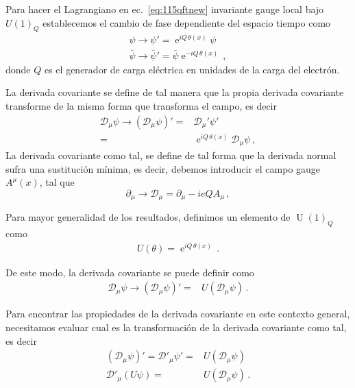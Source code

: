 \begin{frame}
Para hacer el Lagrangiano en ec.~\eqref{eq:115qftnew} invariante gauge local bajo $U(1)_Q$ establecemos el cambio de fase dependiente del espacio tiempo como
\begin{align}
  \psi\to\psi'=\operatorname{e}^{iQ\, \theta(x)}\psi\nonumber\\
  \bar{\psi}\to\bar{\psi}'=\bar{\psi}\operatorname{e}^{-iQ\,\theta(x)}\,,
\end{align}
donde $Q$ es el generador de carga eléctrica en unidades de la carga del electrón.

La derivada covariante se define de tal manera que la propia derivada covariante transforme de la misma forma que transforma el campo, es decir
\begin{align}
  \mathcal{D}_{\mu}\psi\to \left( \mathcal{D}_{\mu}\psi \right)'=&\mathcal{D}_{\mu}'\psi' \nonumber\\
=&\operatorname{e}^{iQ\, \theta(x)}\mathcal{D}_{\mu}\psi\,,
\end{align}
La derivada covariante como tal, se define de tal forma  que la derivada normal sufra una sustitución mínima, es decir, debemos introducir el campo gauge $A^\mu(x)$, tal que
\begin{equation}
  \label{eq:202qft}
  \partial_\mu\to\mathcal{D}_\mu=\partial_\mu-ieQA_\mu\,,
\end{equation}


Para mayor generalidad de los resultados, definimos un elemento de $\operatorname{U}(1)_Q$ como
\begin{align}
  U(\theta)=\operatorname{e}^{iQ\, \theta(x)}\,.
\end{align}

De este modo, la derivada covariante se puede definir como
\begin{align}
     \mathcal{D}_\mu \psi\to\left(\mathcal{D}_\mu \psi\right)'=&U\left(\mathcal{D}_\mu \psi\right)\,.
\end{align}

Para encontrar las propiedades de la derivada covariante en este contexto general, necesitamos evaluar cual es la transformación de la derivada covariante como tal, es decir
\begin{align}
\label{eq:covargen}
 \left(\mathcal{D}_\mu \psi\right)'=     \mathcal{D}'_\mu \psi'=&U\left(\mathcal{D}_\mu \psi\right)\nonumber\\
    \mathcal{D}'_\mu \left( U\psi \right)=&U\left(\mathcal{D}_\mu \psi\right)\,.
\end{align}


\end{frame}

